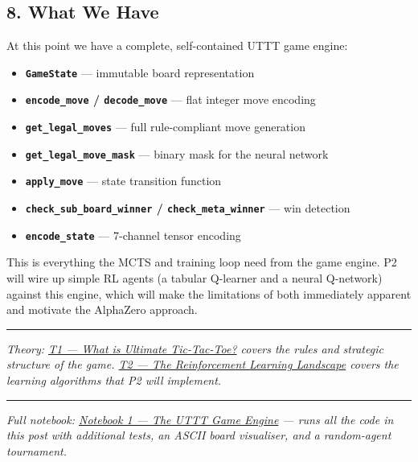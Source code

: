 \hypertarget{what-we-have}{%
\subsection{8. What We Have}\label{what-we-have}}

At this point we have a complete, self-contained UTTT game engine:

\begin{itemize}
\tightlist
\item
  \textbf{\texttt{GameState}} --- immutable board representation
\item
  \textbf{\texttt{encode\_move} / \texttt{decode\_move}} --- flat
  integer move encoding
\item
  \textbf{\texttt{get\_legal\_moves}} --- full rule-compliant move
  generation
\item
  \textbf{\texttt{get\_legal\_move\_mask}} --- binary mask for the
  neural network
\item
  \textbf{\texttt{apply\_move}} --- state transition function
\item
  \textbf{\texttt{check\_sub\_board\_winner} /
  \texttt{check\_meta\_winner}} --- win detection
\item
  \textbf{\texttt{encode\_state}} --- 7-channel tensor encoding
\end{itemize}

This is everything the MCTS and training loop need from the game engine.
P2 will wire up simple RL agents (a tabular Q-learner and a neural
Q-network) against this engine, which will make the limitations of both
immediately apparent and motivate the AlphaZero approach.

\begin{center}\rule{0.5\linewidth}{0.5pt}\end{center}

\emph{Theory: \href{essay1_what_is_uttt.md}{T1 --- What is Ultimate
Tic-Tac-Toe?} covers the rules and strategic structure of the game.
\href{essay1b_rl_background.md}{T2 --- The Reinforcement Learning
Landscape} covers the learning algorithms that P2 will implement.}

\begin{center}\rule{0.5\linewidth}{0.5pt}\end{center}

\emph{Full notebook:
\href{https://colab.research.google.com/github/thltsui/UlltimateTicTacToe/blob/Substack/substack/notebook_1_uttt_engine.ipynb}{Notebook
1 --- The UTTT Game Engine} --- runs all the code in this post with
additional tests, an ASCII board visualiser, and a random-agent
tournament.}
